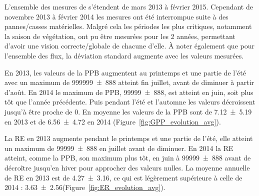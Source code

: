 L'ensemble des mesures de \coo s'étendent de mars 2013 à février 2015.
Cependant de novembre 2013 à février 2014 les mesures ont été interrompue suite à des pannes/casses matérielles.
Malgré cela les périodes les plus critiques, notamment la saison de végétation, ont pu être mesurées pour les 2 années, permettant d'avoir une vision correcte/globale de chacune d'elle.
À noter également que pour l'ensemble des flux, la déviation standard augmente avec les valeurs mesurées.

En 2013, les valeurs de la PPB augmentent au printemps et une partie de l'été avec un maximum de \SI{999999(888)}{\uml} atteint fin juillet, avant de diminuer à partir d'août.
En 2014 le maximum de PPB, \SI{99999(888)}{\uml}, est atteint en juin, soit plus tôt que l'année précédente.
Puis pendant l'été et l'automne les valeurs décroissent jusqu'à être proche de 0.
En moyenne les valeurs de la PPB sont de \SI{7.12(519)}{\uml} en 2013 et de \SI{6.56(472)}{\uml} en 2014 (Figure~\ref{fig:GPP_evolution_avg}).




La RE en 2013 augmente pendant le printemps et une partie de l'été, elle atteint un maximum de \SI{99999(888)}{\uml} en juillet avant de diminuer.
En 2014 la RE atteint, comme la PPB, son maximum plus tôt, en juin à \SI{99999(888)}{\uml} avant de décroître jusqu'en hiver pour approcher des valeurs nulles.
La moyenne annuelle de RE en 2013 est de \SI{4.27(316)}{\uml}, ce qui est légèrement supérieure à celle de 2014 : \SI{3.63(256)}{\uml}(Figure~\ref{fig:ER_evolution_avg}).





